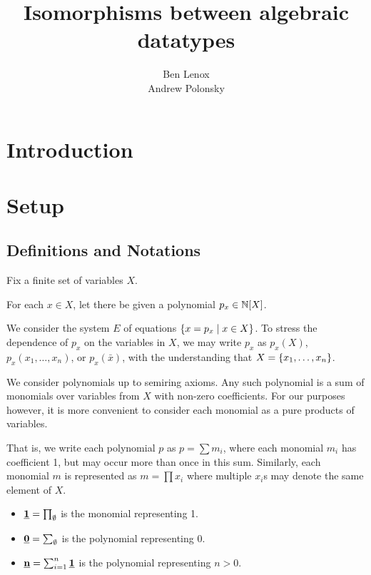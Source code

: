 \documentclass[numbers=enddot]{scrartcl}
\title{Isomorphisms between algebraic datatypes}
\author{Ben Lenox\\ Andrew Polonsky}
\newcommand{\mzero}{\ul{\mathbf{0}}}
\newcommand{\mone}{\ul{\mathbf{1}}}
\newcommand{\const}[1]{\ul{\mathbf{#1}}}
\begin{document}
\maketitle
\tableofcontents

\section{Introduction}

\section{Setup}

\subsection{Definitions and Notations}

Fix a finite set of variables $X$.  %

For each $x \in X$, let there be given a polynomial $p_x \in \mathbb{N}[X]$.

We consider the system $E$ of equations $\left\{x = p_x \mid x \in X\right\}$.
To stress the dependence of $p_x$ on the variables in $X$, we may write
$p_x$ as $p_x(X)$, $p_x(x_1,\dots,x_n)$, or $p_x(\bar x)$, with the
understanding that $X = \left\{x_1,\dots,x_n\right\}$.

We consider polynomials up to semiring axioms.
Any such polynomial is a sum of monomials over variables from $X$ with non-zero coefficients.
For our purposes however, it is more convenient to consider each monomial as a pure
 products of variables.

 That is, we write each polynomial $p$ as $p = \sum m_i$, where each monomial $m_i$
 has coefficient 1, but may occur more than once in this sum.
 Similarly, each monomial $m$ is represented as $m = \prod x_i$
 where multiple $x_i$s may denote the same element of $X$.

 \begin{notn}\hfill
   \begin{itemize}
     \item $\mone = \prod_{\emptyset}$ is the monomial representing 1.
     \item $\mzero = \sum_\emptyset$ is the polynomial representing 0.
     \item $\const{n} = \sum_{i = 1}^n \mone$ is the polynomial representing $n > 0$.
   \end{itemize}
 \end{notn}
\end{document}

